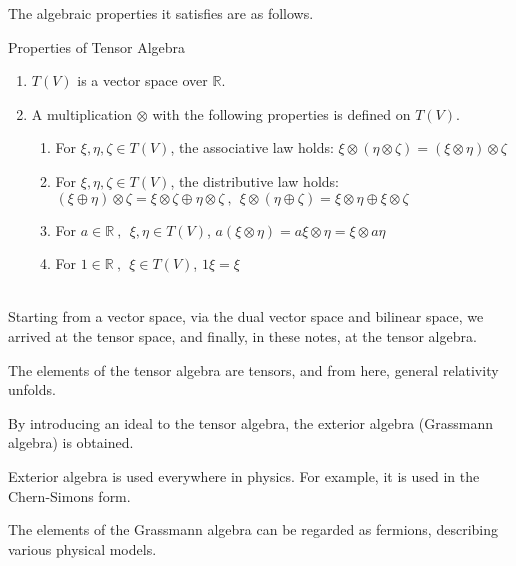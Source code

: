 \documentclass[uplatex,a4j,12pt,dvipdfmx]{jsarticle}
\begin{document}
The algebraic properties it satisfies are as follows.

\begin{itembox}[l]{Properties of Tensor Algebra}
	\begin{enumerate}
		\item $T(V)$ is a vector space over $\mathbb{R}$.
		\item A multiplication $\otimes$ with the following properties is defined on $T(V)$.
		      \begin{enumerate}
			      \item For $\xi,\eta,\zeta \in T(V)$, the associative law holds: $\xi \otimes (\eta \otimes \zeta) = (\xi \otimes \eta) \otimes \zeta$
			      \item For $\xi,\eta,\zeta \in T(V)$, the distributive law holds: $(\xi \oplus \eta) \otimes \zeta = \xi \otimes \zeta \oplus \eta \otimes \zeta \ , \ \ \xi \otimes (\eta \oplus \zeta) = \xi \otimes \eta \oplus \xi \otimes \zeta$
			      \item For $a \in \mathbb{R} \ , \ \ \xi,\eta \in T(V)$, $a (\xi \otimes \eta) = a \xi \otimes \eta = \xi \otimes a \eta$
			      \item For $1 \in \mathbb{R} \ , \ \ \xi \in T(V)$, $1\xi=\xi$
		      \end{enumerate}
	\end{enumerate}
\end{itembox}

\ \\

Starting from a vector space, via the dual vector space and bilinear space, we arrived at the tensor space, and finally, in these notes, at the tensor algebra.

The elements of the tensor algebra are tensors, and from here, general relativity unfolds.

By introducing an ideal to the tensor algebra, the exterior algebra (Grassmann algebra) is obtained.

Exterior algebra is used everywhere in physics.
For example, it is used in the Chern-Simons form.

The elements of the Grassmann algebra can be regarded as fermions, describing various physical models.
\end{document}
